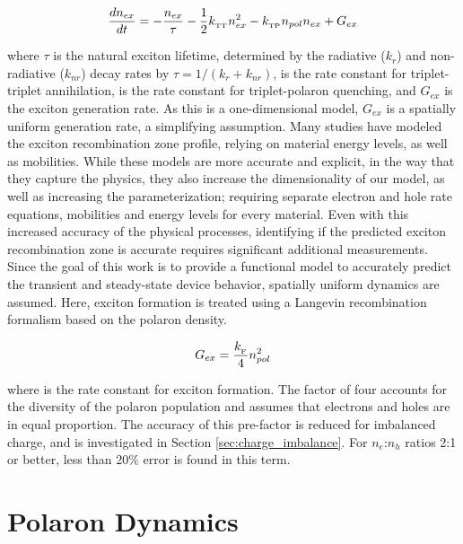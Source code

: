 \documentclass[../thesis.tex]{subfiles}
\begin{document}
\begin{equation}
\frac{dn_{ex}}{dt} = - \frac{n_{ex}}{\tau}-\frac{1}{2}k_{_\text{\tiny TT}} n_{ex}^2-k_{_\text{\tiny TP}} n_{pol}n_{ex}+G_{ex}
\label{eqn:exciton_rate}
\end{equation}

where $\tau$ is the natural exciton lifetime, determined by the radiative ($k_r$) and non-radiative ($k_{nr}$) decay rates by $\tau=1/(k_r+k_{nr})$, \ktt is the rate constant for triplet-triplet annihilation, \ktp is the rate constant for triplet-polaron quenching, and $G_{ex}$ is the exciton generation rate.  
As this is a one-dimensional model, $G_{ex}$ is a spatially uniform generation rate, a simplifying assumption.
Many studies have modeled the exciton recombination zone profile, relying on material energy levels, as well as mobilities.\supercite{Rihani2006,Hassine2001,Hassine2002,Ruhstaller2003,Ruhstaller2001}
While these models are more accurate and explicit, in the way that they capture the physics, they also increase the dimensionality of our model, as well as increasing the parameterization; requiring separate electron and hole rate equations, mobilities and energy levels for every material.
Even with this increased accuracy of the physical processes, identifying if the predicted exciton recombination zone is accurate requires significant additional measurements.
Since the goal of this work is to provide a functional model to accurately predict the transient and steady-state device behavior, spatially uniform dynamics are assumed.
Here, exciton formation is treated using a Langevin recombination formalism based on the polaron density.\supercite{Ruhstaller2003,Pinner1999,Blom1996}

\begin{equation}
G_{ex}=\frac{k_{_\text{\tiny F}}}{4}n_{pol}^2
\label{eqn:exciton_formation}
\end{equation}

where \kf is the rate constant for exciton formation.  The factor of four accounts for the diversity of the polaron population and assumes that electrons and holes are in equal proportion.  
The accuracy of this pre-factor is reduced for imbalanced charge, and is investigated in Section \ref{sec:charge_imbalance}.
For $n_e$:$n_h$ ratios 2:1 or better, less than 20\% error is found in this term.  

\section{Polaron Dynamics}
\end{document}
